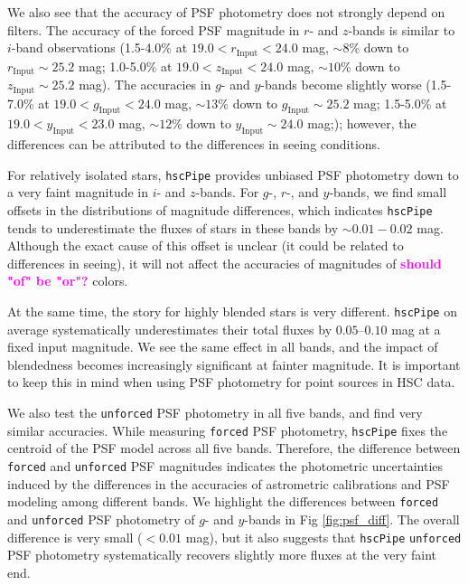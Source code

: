 \documentclass[useamsfonts]{pasj01}
\def\hscpipe{\texttt{hscPipe}}
\def\forced{\texttt{forced}}
\def\unforced{\texttt{unforced}}
\newcommand{\susan}[1]{\textcolor{magenta} {\textbf{#1}}}
\begin{document}
    We also see that the accuracy of PSF photometry does not strongly depend on filters.
    The accuracy of the forced PSF magnitude in $r$- and $z$-bands is similar to 
    $i$-band observations (1.5-4.0\% at $19.0 < r_{\mathrm{Input}} < 24.0$ mag, ${\sim}8$\% down to
    $r_{\mathrm{Input}}{\sim}25.2$ mag;
    1.0-5.0\% at $19.0 < z_{\mathrm{Input}} < 24.0$ mag, ${\sim}10$\% down to
    $z_{\mathrm{Input}}{\sim}25.2$ mag).
    The accuracies in $g$- and $y$-bands become slightly worse (1.5-7.0\% at $19.0 < g_{\mathrm{Input}} < 24.0$ mag, ${\sim}13$\% down to
    $g_{\mathrm{Input}}{\sim}25.2$ mag;
    1.5-5.0\% at $19.0 < y_{\mathrm{Input}} < 23.0$ mag, ${\sim}12$\% down to
    $y_{\mathrm{Input}}{\sim}24.0$ mag;); however, the differences can be attributed to the
    differences in seeing conditions.

    For relatively isolated stars, \hscpipe{} provides unbiased PSF photometry down to a
    very faint magnitude in $i$- and $z$-bands.
    For $g$-, $r$-, and $y$-bands, we find small offsets in the distributions of magnitude
    differences, which indicates \hscpipe{} tends to underestimate the fluxes of stars
    in these bands by ${\sim}0.01-0.02$ mag.
    Although the exact cause of this offset is unclear (it could be related to
    differences in seeing), it will not affect the accuracies of magnitudes of \susan{should "of" be "or"?} colors.

    At the same time, the story for highly blended stars is very different.
    \hscpipe{} on average systematically underestimates their total fluxes by
    $0.05$--$0.10$ mag at a fixed input magnitude.
    We see the same effect in all bands, and the impact of blendedness becomes
    increasingly significant at fainter magnitude.
    It is important to keep this in mind when using PSF photometry for point
    sources in HSC data.

    We also test the \unforced{} PSF photometry in all five bands, and find very similar
    accuracies.
    While measuring \forced{} PSF photometry, \hscpipe{} fixes the centroid
    of the PSF model across all five bands.
    Therefore, the  difference between \forced{} and \unforced{} PSF magnitudes
    indicates the photometric uncertainties induced by the differences in the accuracies of
    astrometric calibrations and PSF modeling among different bands.
    We highlight the differences between \forced{} and \unforced{} PSF photometry of
    $g$- and $y$-bands in Fig \ref{fig:psf_diff}.
    The overall difference is very small ($<0.01$ mag), but it also suggests that
    \hscpipe{} \unforced{} PSF photometry systematically recovers slightly more fluxes
    at the very faint end.
\end{document}
